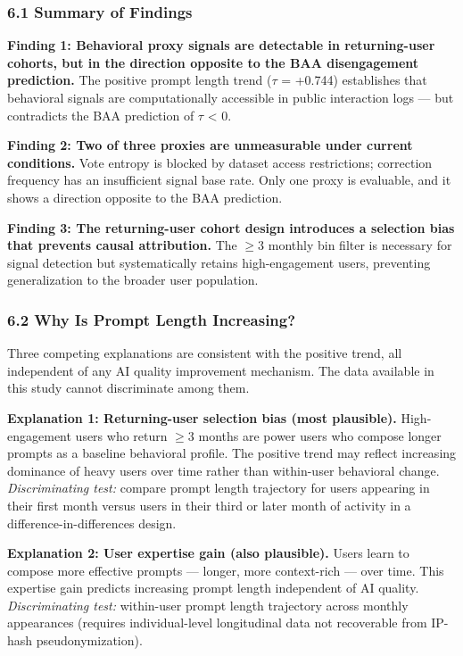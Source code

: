 
\subsubsection{6.1 Summary of Findings}

\textbf{Finding 1: Behavioral proxy signals are detectable in returning-user cohorts, but in the direction opposite to the BAA disengagement prediction.} The positive prompt length trend ($\tau$ = +0.744) establishes that behavioral signals are computationally accessible in public interaction logs --- but contradicts the BAA prediction of $\tau$ < 0.

\textbf{Finding 2: Two of three proxies are unmeasurable under current conditions.} Vote entropy is blocked by dataset access restrictions; correction frequency has an insufficient signal base rate. Only one proxy is evaluable, and it shows a direction opposite to the BAA prediction.

\textbf{Finding 3: The returning-user cohort design introduces a selection bias that prevents causal attribution.} The $\geq 3$ monthly bin filter is necessary for signal detection but systematically retains high-engagement users, preventing generalization to the broader user population.

\subsubsection{6.2 Why Is Prompt Length Increasing?}

Three competing explanations are consistent with the positive trend, all independent of any AI quality improvement mechanism. The data available in this study cannot discriminate among them.

\textbf{Explanation 1: Returning-user selection bias (most plausible).} High-engagement users who return $\geq 3$ months are power users who compose longer prompts as a baseline behavioral profile. The positive trend may reflect increasing dominance of heavy users over time rather than within-user behavioral change. \textit{Discriminating test:} compare prompt length trajectory for users appearing in their first month versus users in their third or later month of activity in a difference-in-differences design.

\textbf{Explanation 2: User expertise gain (also plausible).} Users learn to compose more effective prompts --- longer, more context-rich --- over time. This expertise gain predicts increasing prompt length independent of AI quality. \textit{Discriminating test:} within-user prompt length trajectory across monthly appearances (requires individual-level longitudinal data not recoverable from IP-hash pseudonymization).

